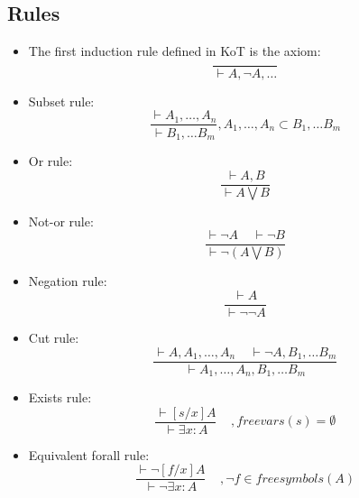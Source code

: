 \documentclass[a4paper,12pt]{article}
\begin{document}
\subsection{Rules}
\begin{itemize}
 \item The first induction rule defined in KoT is the axiom:
\begin{equation}
 \frac{}{\vdash A, \neg A, \ldots}
\end{equation} 

\item Subset rule:
\begin{equation}
 \frac{\vdash A_{1}, \ldots , A_{n}}{\vdash B_{1}, \ldots B_{m}} , {A_{1}, \ldots , A_{n}} \subset {B_{1}, \ldots B_{m}}
\end{equation}

\item Or rule:
\begin{equation}
 \frac{\vdash A, B}{\vdash A \bigvee B} 
\end{equation}  

\item Not-or rule:
\begin{equation}
 \frac{\vdash \neg A \; \; \; \; \vdash \neg B}{\vdash \neg (A \bigvee B)} 
\end{equation}  
 
\item Negation rule:
\begin{equation}
 \frac{\vdash A}{\vdash \neg \neg A} 
\end{equation}  

\item Cut rule:
\begin{equation}
 \frac{\vdash A, A_{1}, \ldots , A_{n} \; \; \; \; \vdash \neg A, B_{1}, \ldots B_{m}}
      {\vdash A_{1}, \ldots , A_{n}, B_{1}, \ldots B_{m}}
\end{equation}

\item Exists rule: 
 \begin{equation}
 \frac{\vdash [s/x]A} {\vdash \exists x:A} \; \; \; \;, freevars(s) = \emptyset
\end{equation}  

\item Equivalent forall rule:
 \begin{equation}
 \frac{\vdash \neg [f/x]A} {\vdash \neg \exists x:A} \; \; \; \;, \neg f \in freesymbols(A) 
\end{equation}  


\end{itemize}
\end{document}
